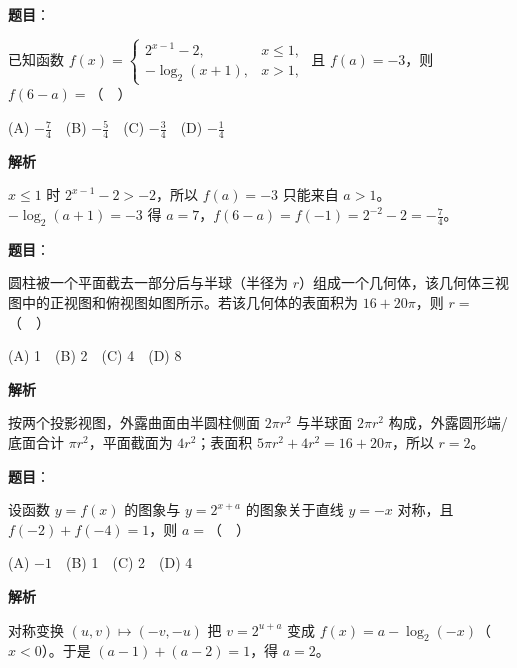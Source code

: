 \begin{answer}

\textbf{题目}：

已知函数 $f(x)=\begin{cases}2^{x-1}-2,&x\leqslant1,\\-\log_2(x+1),&x>1,\end{cases}$ 且 $f(a)=-3$，则 $f(6-a)=$（　）

(A) $-\frac74$　(B) $-\frac54$　(C) $-\frac34$　(D) $-\frac14$

\textbf{解析}

$x\leq1$ 时 $2^{x-1}-2>-2$，所以 $f(a)=-3$ 只能来自 $a>1$。$-\log_2(a+1)=-3$ 得 $a=7$，$f(6-a)=f(-1)=2^{-2}-2=-\frac74$。


\end{answer}
\begin{answer}

\textbf{题目}：

圆柱被一个平面截去一部分后与半球（半径为 $r$）组成一个几何体，该几何体三视图中的正视图和俯视图如图所示。若该几何体的表面积为 $16+20\pi$，则 $r=$（　）
\nopagebreak[4]
\begin{center}\end{center}
\nopagebreak[4]
\nopagebreak[4]
\begin{center}\end{center}
\nopagebreak[4]
(A) 1　(B) 2　(C) 4　(D) 8

\textbf{解析}

按两个投影视图，外露曲面由半圆柱侧面 $2\pi r^2$ 与半球面 $2\pi r^2$ 构成，外露圆形端/底面合计 $\pi r^2$，平面截面为 $4r^2$；表面积 $5\pi r^2+4r^2=16+20\pi$，所以 $r=2$。


\end{answer}
\begin{answer}

\textbf{题目}：

设函数 $y=f(x)$ 的图象与 $y=2^{x+a}$ 的图象关于直线 $y=-x$ 对称，且 $f(-2)+f(-4)=1$，则 $a=$（　）

(A) $-1$　(B) 1　(C) 2　(D) 4

\textbf{解析}

对称变换 $(u,v)\mapsto(-v,-u)$ 把 $v=2^{u+a}$ 变成 $f(x)=a-\log_2(-x)$（$x<0$）。于是 $(a-1)+(a-2)=1$，得 $a=2$。


\end{answer}
